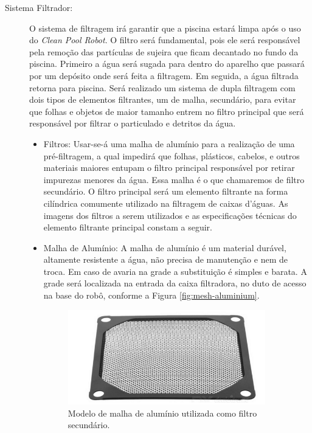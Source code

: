 \begin{description}
\item[Sistema Filtrador:] O sistema de filtragem irá garantir que a piscina
estará limpa após o uso do \textit{Clean Pool Robot}. O filtro será fundamental,
pois ele será responsável pela remoção das partículas de sujeira que ficam decantado
no fundo da piscina. Primeiro a água será sugada para dentro do aparelho que passará por
um depósito onde será feita a filtragem. Em seguida, a água filtrada retorna para
piscina. Será realizado um sistema de dupla filtragem com dois tipos de elementos
filtrantes, um de malha, secundário, para evitar que folhas e objetos de maior
tamanho entrem no filtro principal que será responsável por filtrar o particulado
e detritos da água.
\begin{itemize}
  \item Filtros: Usar-se-á uma malha de alumínio para a realização de uma
  pré-filtragem, a qual impedirá que folhas, plásticos, cabelos, e outros
  materiais maiores entupam o filtro principal responsável por retirar impurezas
  menores da água. Essa malha é o que chamaremos de filtro secundário. O filtro
  principal será um elemento filtrante na forma cilíndrica comumente utilizado
  na filtragem de caixas d’águas. As imagens dos filtros a serem utilizados e as
  especificações técnicas do elemento filtrante principal constam a seguir.
  \item Malha de Alumínio: A malha de alumínio é um material durável, altamente
  resistente a água, não precisa de manutenção e nem de troca. Em caso de avaria na
  grade a substituição é simples e barata. A grade será localizada na entrada
  da caixa filtradora, no duto de acesso na base do robô, conforme a Figura \ref{fig:mesh-aluminium}.
  \par
  \begin{figure}[h]
    \centering
    \includegraphics[width=0.9\textwidth]{figures/mesh-aluminium.png}
    \caption{Modelo de malha de alumínio utilizada como filtro secundário. \cite{dx2016}}
    \label{fig:filter}

\end{figure}
\end{itemize}
\end{description}
